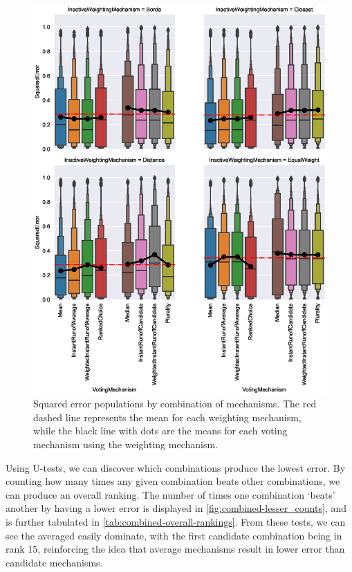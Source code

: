 \begin{figure}[htbp]
    \centering
    \includegraphics[scale=0.75]
    {./content/figures/combinations/combined_comparison}
    \caption{Squared error populations by combination of mechanisms. The red dashed
    line represents the mean for each weighting mechanism, while the black line with
    dots are the means for each voting mechanism using the weighting mechanism.}
    \label{fig:combined-comparison}
\end{figure}


Using U-tests, we can discover which combinations produce the lowest error.
By counting how many times any given combination beats other combinations, we can
produce an overall ranking.
The number of times one combination `beats' another by having a lower error is
displayed in \autoref{fig:combined-lesser_counts}, and is further tabulated in
\autoref{tab:combined-overall-rankings}.
From these tests, we can see the averaged easily dominate, with the first candidate
combination being in rank 15, reinforcing the idea that average mechanisms result in
lower error than candidate mechanisms.

